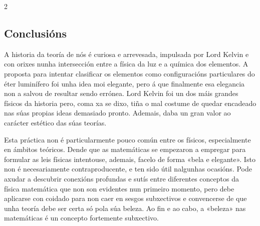 \begin{multicols}{2}
\subsection*{Conclusións}

A historia da teoría de nós é curiosa e arrevesada, impulsada por Lord Kelvin e
con orixes nunha intersección entre a física da luz e a química dos elementos.
A proposta para intentar clasificar os elementos como configuracións
particulares do éter luminífero foi unha idea moi elegante, pero á que
finalmente esa elegancia non a salvou de resultar sendo errónea. Lord Kelvin
foi un dos máis grandes físicos da historia pero, coma xa se dixo, tiña o mal
costume de quedar encadeado nas súas propias ideas demasiado pronto. Ademais,
daba un gran valor ao carácter estético das súas teorías.

Esta práctica non é particularmente pouco común entre os físicos, especialmente
en ámbitos teóricos. Dende que as matemáticas se empezaron a empregar para
formular as leis físicas intentouse, ademais, facelo de forma «bela e
elegante». Isto non é necesariamente contraproducente, e ten sido útil
nalgunhas ocasións. Pode axudar a descubrir conexións profundas e sutís entre
diferentes conceptos da física matemática que non son evidentes nun primeiro
momento, pero debe aplicarse con coidado para non caer en sesgos subxectivos e %
convencerse de que unha teoría debe ser certa só pola súa beleza. Ao fin e ao
cabo, a «beleza» nas matemáticas é un concepto fortemente subxectivo.

\vspace*{\fill}\null
\printbibliography

\end{multicols}
